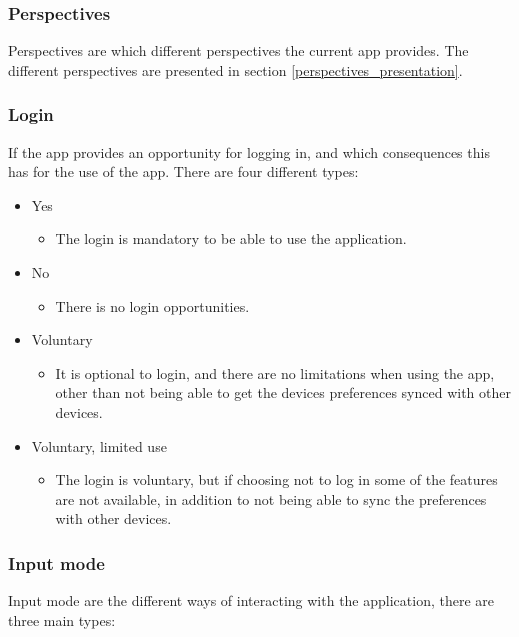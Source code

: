 \subsubsection{Perspectives}
Perspectives are which different perspectives the current app provides. The different perspectives are presented in section \ref{perspectives_presentation}.

\subsubsection{Login}
If the app provides an opportunity for logging in, and which consequences this has for the use of the app. There are four different types:

\begin{itemize}
	\item Yes
	\begin{itemize}
		\item The login is mandatory to be able to use the application.
	\end{itemize}

	\item No
	\begin{itemize}
		\item There is no login opportunities.
	\end{itemize}

	\item Voluntary
	\begin{itemize}
		\item It is optional to login, and there are no limitations when using the app, other than not being able to get the devices preferences synced with other devices.
	\end{itemize}

	\item Voluntary, limited use
	\begin{itemize}
		\item The login is voluntary, but if choosing not to log in some of the features are not available, in addition to not being able to sync the preferences with other devices.
	\end{itemize}
\end{itemize}


\subsubsection{Input mode}
Input mode are the different ways of interacting with the application, there are three main types:

